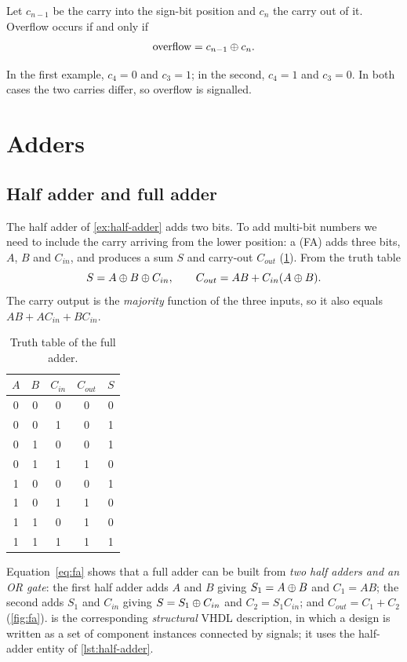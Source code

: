 \begin{keypoint}
Let $c_{n-1}$ be the carry into the sign-bit position and $c_n$ the carry out of it. Overflow occurs if and only if
\[
  \text{overflow} = c_{n-1}\oplus c_n .
\]
\end{keypoint}

In the first example, $c_4=0$ and $c_3=1$; in the second, $c_4=1$ and $c_3=0$. In both cases the two carries differ, so overflow is signalled.

\section{Adders}\label{sec:adders}
\subsection{Half adder and full adder}
The half adder of \cref{ex:half-adder} adds two bits. To add multi-bit numbers we need to include the carry arriving from the lower position: a  (FA) adds three bits, $A$, $B$ and $C_{in}$, and produces a sum $S$ and carry-out $C_{out}$ (\cref{tab:fa}). From the truth table
\begin{equation}
 S = A\oplus B\oplus C_{in}, \qquad C_{out} = AB + C_{in}(A\oplus B).
 \label{eq:fa}
\end{equation}
The carry output is the \emph{majority} function of the three inputs, so it also equals $AB + AC_{in} + BC_{in}$.

\begin{table}[htbp]
\centering
\caption{Truth table of the full adder.}
\label{tab:fa}
\begin{tabular}{ccc|cc}
\toprule
$A$&$B$&$C_{in}$&$C_{out}$&$S$\\ \midrule
0&0&0&0&0\\0&0&1&0&1\\0&1&0&0&1\\0&1&1&1&0\\
1&0&0&0&1\\1&0&1&1&0\\1&1&0&1&0\\1&1&1&1&1\\ \bottomrule
\end{tabular}
\end{table}

Equation~\eqref{eq:fa} shows that a full adder can be built from \emph{two half adders and an OR gate}: the first half adder adds $A$ and $B$ giving $S_1=A\oplus B$ and $C_1=AB$; the second adds $S_1$ and $C_{in}$ giving $S=S_1\oplus C_{in}$ and $C_2=S_1C_{in}$; and $C_{out}=C_1+C_2$ (\cref{fig:fa}).  is the corresponding \emph{structural} VHDL description, in which a design is written as a set of component instances connected by signals; it uses the half-adder entity of \cref{lst:half-adder}.

